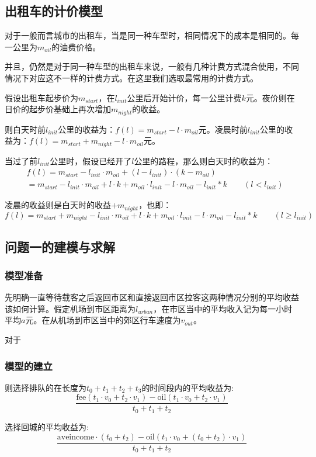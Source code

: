 \documentclass{cumcmthesis}
\begin{document}
\subsection{出租车的计价模型}
对于一般而言城市的出租车，当是同一种车型时，相同情况下的成本是相同的。每一公里为$m_{oil}$的油费价格。\par
并且，仍然是对于同一种车型的出租车来说，一般有几种计费方式混合使用，不同情况下对应这不一样的计费方式。在这里我们选取最常用的计费方式。\par
假设出租车起步价为$m_{start}$，在$l_{init}$公里后开始计价，每一公里计费$k$元。夜价则在日价的起步价基础上再次增加$m_{night}$的收益。\par
则白天时前$l_{init}$公里的收益为：$f(l)=m_{start}-l\cdot m_{oil}$元。凌晨时前$l_{init}$公里的收益为：$f(l)=m_{start}+m_{night}-l\cdot m_{oil}$元。\par
当过了前$l_{init}$公里时，假设已经开了$l$公里的路程，那么则白天时的收益为：
$$
	\begin{array}{lcl}
			& f(l) = m_{start}-l_{init}\cdot m_{oil}+(l-l_{init})\cdot (k-m_{oil})                            \\
		    & = m_{start}-l_{init}\cdot m_{oil}+l\cdot k+m_{oil}\cdot l_{init}-l\cdot m_{oil}-l_{init}*k
		\quad\quad (l< l_{init})
	\end{array}
$$\par
凌晨的收益则是白天时的收益$+m_{night}$，也即：
$$
	f(l)=m_{start}+m_{night}-l_{init}\cdot m_{oil}+l\cdot k+m_{oil}\cdot l_{init}-l\cdot m_{oil}-l_{init}*k
	\quad\quad (l\ge l_{init})
$$

\subsection{问题一的建模与求解}
\subsubsection{模型准备}

先明确一直等待载客之后返回市区和直接返回市区拉客这两种情况分别的平均收益该如何计算。假定机场到市区距离为$l_{urban}$，在市区当中的平均收入记为每一小时平均$a$元。在从机场到市区当中的郊区行车速度为$v_{out}$。
\par
对于
\subsubsection{模型的建立}



则选择排队的在长度为$t_0+t_1+t_2+t_3$的时间段内的平均收益为:
$$ \frac{\mathrm{fee}(t_1\cdot v_0+t_2\cdot v_1)-\mathrm{oil}(t_1\cdot v_0+t_2\cdot v_1)}{t_0+t_1+t_2}$$
\par
选择回城的平均收益为:
$$\frac{\mathrm{aveincome}\cdot (t_0+t_2)-\mathrm{oil}(t_1\cdot v_0+(t_0+t_2)\cdot v_1)}{t_0+t_1+t_2}$$
\par
\end{document}
